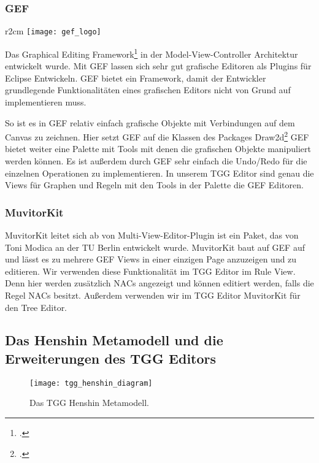 \subsubsection{GEF}
\begin{wrapfigure}{r}{2cm}
	\centering
	\texttt{[image: gef\_logo]}
	\label{fig:gef_logo}
\end{wrapfigure}
Das Graphical Editing Framework\footcite[][\url{http://www.eclipse.org/modeling/gef/}]{gefwebsite}
in der Model-View-Controller Architektur entwickelt wurde.
Mit GEF lassen sich sehr gut grafische Editoren als Plugins für Eclipse Entwickeln. GEF bietet 
ein Framework, damit der Entwickler grundlegende Funktionalitäten
eines grafischen Editors nicht von Grund auf implementieren muss.


So ist es in GEF relativ einfach grafische Objekte mit Verbindungen auf dem
Canvas zu zeichnen. Hier setzt GEF auf die Klassen des Packages
Draw2d\footcite[][\url{http://www.eclipse.org/gef/draw2d/}]{draw2dwebsite}
GEF bietet weiter eine Palette mit Tools mit denen die grafischen Objekte
manipuliert werden können. Es ist außerdem durch GEF sehr einfach die Undo/Redo
für die einzelnen Operationen zu implementieren.
In unserem TGG Editor sind genau die Views für Graphen und
Regeln mit den Tools in der Palette die GEF Editoren.

\subsubsection{MuvitorKit}
MuvitorKit leitet sich ab von Multi-View-Editor-Plugin
ist ein Paket, das von Toni Modica an der TU Berlin entwickelt wurde. MuvitorKit
baut auf GEF auf und lässt es zu mehrere GEF Views in einer einzigen Page
anzuzeigen und zu editieren. Wir verwenden diese Funktionalität im TGG Editor
im Rule View. Denn hier werden zusätzlich NACs
angezeigt und können editiert werden, falls die Regel NACs besitzt. Außerdem
verwenden wir im TGG Editor MuvitorKit für den Tree Editor.

\subsection{Das Henshin Metamodell und die Erweiterungen des TGG
Editors}\label{sec:henshin_modell}
\begin{figure}[htbp]
	\centering %
	\texttt{[image: tgg\_henshin\_diagram]}
	\caption[TGG Henshin Metamodell]{Das TGG Henshin Metamodell.}
	\label{fig:tgg_henshin_diagram}
\end{figure}

